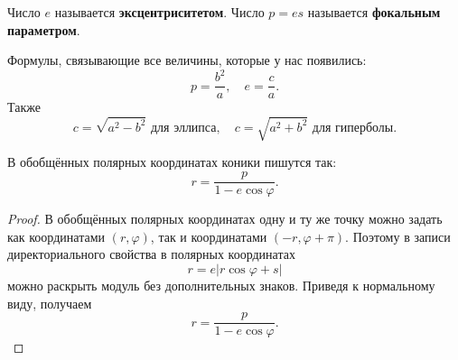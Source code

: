 \begin{definition}
    Число $e$ называется \textbf{эксцентриситетом}. Число $p = es$ называется \textbf{фокальным параметром}.
\end{definition}

Формулы, связывающие все величины, которые у нас появились:
$$
p = \frac{b^2}{a},\quad e = \frac{c}{a}.
$$
Также
$$
c = \sqrt{a^2 - b^2}\text{ для эллипса},\quad c = \sqrt{a^2 + b^2}\text{ для гиперболы}.
$$

\begin{theorem}
    В обобщённых полярных координатах коники пишутся так:
    $$
    r = \frac{p}{1 - e\cos\varphi}.
    $$
\end{theorem}

\begin{proof}
    В обобщённых полярных координатах одну и ту же точку можно задать как координатами $(r, \varphi)$, так и координатами $(-r, \varphi + \pi)$. Поэтому в записи директориального свойства в полярных координатах
    $$
    r = e|r\cos\varphi + s|
    $$
    можно раскрыть модуль без дополнительных знаков. Приведя к нормальному виду, получаем
    $$
    r = \frac{p}{1 - e\cos\varphi}.
    $$
\end{proof}


